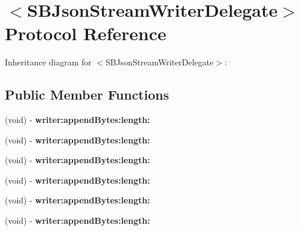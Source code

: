 \hypertarget{protocol_s_b_json_stream_writer_delegate-p}{
\section{$<$\-S\-B\-Json\-Stream\-Writer\-Delegate$>$ \-Protocol \-Reference}
\label{protocol_s_b_json_stream_writer_delegate-p}
}


\-Inheritance diagram for $<$\-S\-B\-Json\-Stream\-Writer\-Delegate$>$\-:
\subsection*{\-Public \-Member \-Functions}
\begin{DoxyCompactItemize}
\item 
\hypertarget{protocol_s_b_json_stream_writer_delegate-p_a969263873e164a2c1032fb26ff92faac}{
(void) -\/ {\bfseries writer\-:append\-Bytes\-:length\-:}}
\label{protocol_s_b_json_stream_writer_delegate-p_a969263873e164a2c1032fb26ff92faac}

\item 
\hypertarget{protocol_s_b_json_stream_writer_delegate-p_a969263873e164a2c1032fb26ff92faac}{
(void) -\/ {\bfseries writer\-:append\-Bytes\-:length\-:}}
\label{protocol_s_b_json_stream_writer_delegate-p_a969263873e164a2c1032fb26ff92faac}

\item 
\hypertarget{protocol_s_b_json_stream_writer_delegate-p_a969263873e164a2c1032fb26ff92faac}{
(void) -\/ {\bfseries writer\-:append\-Bytes\-:length\-:}}
\label{protocol_s_b_json_stream_writer_delegate-p_a969263873e164a2c1032fb26ff92faac}

\item 
\hypertarget{protocol_s_b_json_stream_writer_delegate-p_a969263873e164a2c1032fb26ff92faac}{
(void) -\/ {\bfseries writer\-:append\-Bytes\-:length\-:}}
\label{protocol_s_b_json_stream_writer_delegate-p_a969263873e164a2c1032fb26ff92faac}

\item 
\hypertarget{protocol_s_b_json_stream_writer_delegate-p_a969263873e164a2c1032fb26ff92faac}{
(void) -\/ {\bfseries writer\-:append\-Bytes\-:length\-:}}
\label{protocol_s_b_json_stream_writer_delegate-p_a969263873e164a2c1032fb26ff92faac}

\item 
\hypertarget{protocol_s_b_json_stream_writer_delegate-p_a969263873e164a2c1032fb26ff92faac}{
(void) -\/ {\bfseries writer\-:append\-Bytes\-:length\-:}}
\label{protocol_s_b_json_stream_writer_delegate-p_a969263873e164a2c1032fb26ff92faac}


\end{DoxyCompactItemize}
